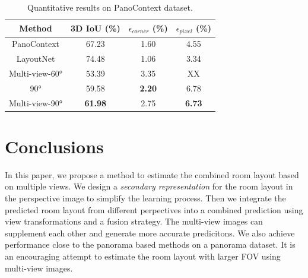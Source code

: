 

\begin{table}
	\caption{Quantitative results on PanoContext dataset. }
	\label{tab:PC}
	\begin{tabular}{cccc}
		\toprule
		Method&3D IoU (\%)& $\epsilon_{corner}$ (\%) & $\epsilon_{pixel}$ (\%)\\
		\midrule
		PanoContext \cite{zhang2014panocontext} & 67.23 & 1.60 & 4.55\\
		LayoutNet \cite{zou2018layoutnet} & 74.48 & 1.06 & 3.34\\
		Multi-view-\ang{60} & 53.39 & 3.35 & XX\\	
		\ang{90} & 59.58 & \textbf{2.20} & 6.78\\	
		Multi-view-\ang{90} & \textbf{61.98} & 2.75 & \textbf{6.73}\\	
		\bottomrule
	\end{tabular}
\end{table}

\section{Conclusions}
In this paper, we propose a method to estimate the combined room layout based on multiple views. We design a \emph{secondary representation} for the room layout in the perspective image to simplify the learning process. Then we integrate the predicted room layout from different perpectives into a combined prediction using view transformations and a fusion strategy. The multi-view images can supplement each other and generate more accurate predicitons. We also achieve performance close to the panorama based methods on a panorama dataset. It is an encouraging attempt to estimate the room layout with larger FOV using multi-view images.


